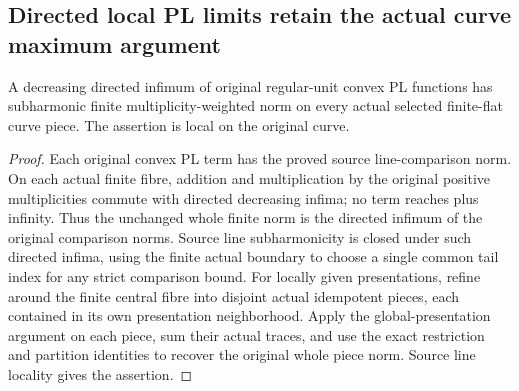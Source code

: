 \subsection{Directed local PL limits retain the actual curve maximum argument}

\begin{lemma}
\label{lem:fc-directed-pl-curve-piece-trace}
\leanok
A decreasing directed infimum of original regular-unit convex PL functions
has subharmonic finite multiplicity-weighted norm on every actual selected
finite-flat curve piece. The assertion is local on the original curve.
\end{lemma}
\begin{proof}
Each original convex PL term has the proved source line-comparison norm.
On each actual finite fibre, addition and multiplication by the original
positive multiplicities commute with directed decreasing infima; no term
reaches plus infinity. Thus the unchanged whole finite norm is the directed
infimum of the original comparison norms. Source line subharmonicity is closed
under such directed infima, using the finite actual boundary to choose a
single common tail index for any strict comparison bound. For locally given
presentations, refine around the finite central fibre into disjoint actual
idempotent pieces, each contained in its own presentation neighborhood. Apply
the global-presentation argument on each piece, sum their actual traces, and
use the exact restriction and partition identities to recover the original
whole piece norm. Source line locality gives the assertion.
\end{proof}

